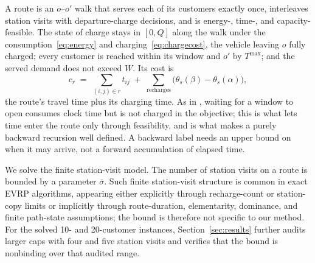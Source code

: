 \documentclass[review,3p,authoryear]{elsarticle}
\theoremstyle{plain}
\theoremstyle{definition}
\theoremstyle{remark}
\newcommand{\Tmax}{T^{\max}}
\begin{document}
A route is an $o$--$o'$ walk that serves each of its customers exactly once,
interleaves station visits with departure-charge decisions, and is energy-, time-,
and capacity-feasible. The state of charge stays in $[0,Q]$ along the walk under the
consumption~\eqref{eq:energy} and charging~\eqref{eq:chargecost}, the vehicle
leaving $o$ fully charged; every customer is reached within its window and $o'$ by
$\Tmax$; and the served demand does not exceed $W$. Its cost is
\begin{equation}
\label{eq:routecost}
c_r \;=\; \sum_{(i,j)\in r} t_{ij} \;+\; \sum_{\text{recharges}}
\bigl(\theta_s(\beta)-\theta_s(\alpha)\bigr),
\end{equation}
the route's travel time plus its charging time. As in
\citet{Montoya2017}, waiting for a window to open consumes clock time but is not
charged in the objective; this is what lets time enter the route only through
feasibility, and is what makes a purely backward recursion well defined. A backward
label needs an upper bound on when it may arrive, not a forward accumulation
of elapsed time.

We solve the finite station-visit model. The number of station visits on a route is
bounded by a parameter \(\bar\sigma\). Such finite station-visit structure is common in
exact EVRP algorithms, appearing either explicitly through recharge-count
or station-copy limits \citep{SchneiderStengerGoeke2014,Desaulniers2016} or implicitly
through route-duration, elementarity, dominance, and finite path-state assumptions; the
bound is therefore not specific to our method. For the solved 10- and 20-customer
instances, Section~\ref{sec:results} further audits larger caps with four and five
station visits and verifies that the bound is nonbinding over that audited range.
\end{document}
